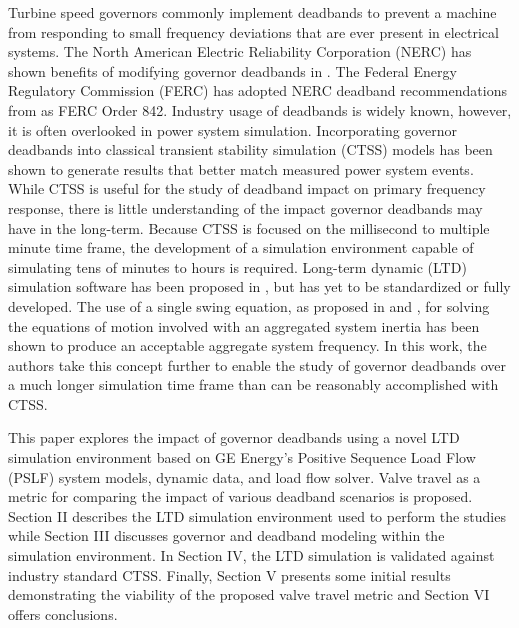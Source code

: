 %
%
Turbine speed governors commonly implement deadbands to prevent a machine from responding to small frequency deviations that are ever present in electrical systems.
The North American Electric Reliability Corporation (NERC) has shown benefits of modifying governor deadbands in \cite{nercFRI2012}.
The Federal Energy Regulatory Commission (FERC) has adopted NERC deadband recommendations from \cite{nercFRI2012} as FERC Order 842\cite{ferc2018}.
Industry usage of deadbands is widely known, however, it is often overlooked in power system simulation.
Incorporating governor deadbands into classical transient stability simulation (CTSS) models has been shown to generate results that better match measured power system events\cite{kou2016}.
While CTSS is useful for the study of deadband impact on primary frequency response, there is little understanding of the impact governor deadbands may have in the long-term. 
Because CTSS is focused on the millisecond to multiple minute time frame, the development of a simulation environment capable of simulating tens of minutes to hours is required. 
Long-term dynamic (LTD) simulation software has been proposed in \cite{AGCCresap, Stajcar, DonnellyVoltageControl}, but has yet to be standardized or fully developed.
The use of a single swing equation, as proposed in \cite{AGCCresap} and \cite{Stajcar}, for solving the equations of motion involved with an aggregated system inertia has been shown to produce an acceptable aggregate system frequency. 
In this work, the authors take this concept further to enable the study of governor deadbands over a much longer simulation time frame than can be reasonably accomplished with CTSS. 

This paper explores the impact of governor deadbands using a novel LTD simulation environment based on GE Energy's Positive Sequence Load Flow (PSLF) system models, dynamic data, and load flow solver. 
Valve travel as a metric for comparing the impact of various deadband scenarios is proposed. 
Section II describes the LTD simulation environment used to perform the studies while
Section III discusses governor and deadband modeling within the simulation environment. 
In Section IV, the LTD simulation is validated against industry standard CTSS. 
Finally, Section V presents some initial results demonstrating the viability of the proposed valve travel metric and Section VI offers conclusions.
